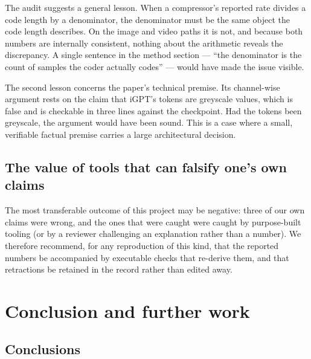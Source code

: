 \documentclass[11pt,a4paper]{article}
\begin{document}
The audit suggests a general lesson. When a compressor's reported rate divides a
code length by a denominator, the denominator must be the same object the code
length describes. On the image and video paths it is not, and because both
numbers are internally consistent, nothing about the arithmetic reveals the
discrepancy. A single sentence in the method section --- ``the denominator is the
count of samples the coder actually codes'' --- would have made the issue visible.

The second lesson concerns the paper's technical premise. Its channel-wise
argument rests on the claim that iGPT's tokens are greyscale values, which is
false and is checkable in three lines against the checkpoint. Had the tokens been
greyscale, the argument would have been sound. This is a case where a small,
verifiable factual premise carries a large architectural decision.

\subsection{The value of tools that can falsify one's own claims}

The most transferable outcome of this project may be negative: three of our own
claims were wrong, and the ones that were caught were caught by purpose-built
tooling (or by a reviewer challenging an explanation rather than a number). We
therefore recommend, for any reproduction of this kind, that the reported numbers
be accompanied by executable checks that re-derive them, and that retractions be
retained in the record rather than edited away.

\section{Conclusion and further work}

\subsection{Conclusions}
\end{document}
